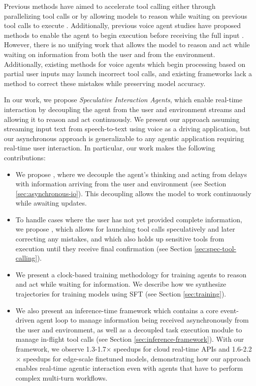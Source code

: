 Previous methods have aimed to accelerate tool calling either through parallelizing tool calls \citep{kim2024llm} or by allowing models to reason while waiting on previous tool calls to execute \citep{gim2024asynchronous}.
Additionally, previous voice agent studies have proposed methods to enable the agent to begin execution before receiving the full input \citep{arora2025stream,chiang2025shanks}.
However, there is no unifying work that allows the model to reason and act while waiting on information from both the user and from the environment.
Additionally, existing methods for voice agents which begin processing based on partial user inputs may launch incorrect tool calls, and existing frameworks lack a method to correct these mistakes while preserving model accuracy.

In our work, we propose \textit{Speculative Interaction Agents}, which enable real-time interaction by decoupling the agent from the user and environment streams and allowing it to reason and act continuously.
We present our approach assuming streaming input text from speech-to-text using voice as a driving application, but our asynchronous approach is generalizable to any agentic application requiring real-time user interaction.
In particular, our work makes the following contributions:

\vspace{-3mm}
\begin{itemize}
\setlength\itemsep{2pt}
    \item We propose \ASYNCIO, where we decouple the agent's thinking and acting from delays with information arriving from the user and environment (see Section \ref{sec:asynchronous-io}). This decoupling allows the model to work continuously while awaiting updates.
    \item To handle cases where the user has not yet provided complete information, we propose \SPECTOOL, which allows for launching tool calls speculatively and later correcting any mistakes, and which also holds up sensitive tools from execution until they receive final confirmation (see Section \ref{sec:spec-tool-calling}).
    \item We present a clock-based training methodology for training agents to reason and act while waiting for information. We describe how we synthesize trajectories for training models using SFT (see Section \ref{sec:training}).
    \item We also present an inference-time framework which contains a core event-driven agent loop to manage information being received asynchronously from the user and environment, as well as a decoupled task execution module to manage in-flight tool calls (see Section \ref{sec:inference-framework}).
    With our framework, we observe 1.3-1.7$\times$ speedups for cloud real-time APIs and 1.6-2.2$\times$ speedups for edge-scale finetuned models, demonstrating how our approach enables real-time agentic interaction even with agents that have to perform complex multi-turn workflows.
\end{itemize}